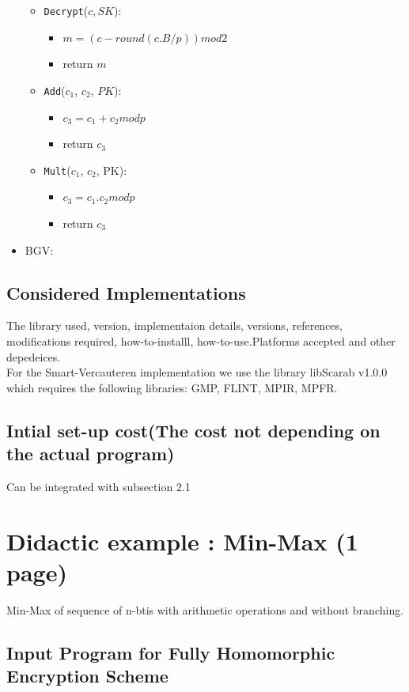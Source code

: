 \documentclass{acm_proc_article-sp}
\begin{document}
\begin{itemize}
\begin{itemize}
\begin{itemize}
\end{itemize}
\item \texttt{Decrypt}($c, SK$):
\begin{itemize}
\item $m= (c - round(c.B/p)) mod 2$
\item return $m$
\end{itemize}
\item \texttt{Add}($c_1$, $c_2$, $PK$):
\begin{itemize}
\item $c_3=c_1+c_2 mod p$
\item return $c_3$
\end{itemize}
\item \texttt{Mult}($c_1$, $c_2$, PK):
\begin{itemize}
\item $c_3=c_1.c_2 mod p$
\item return $c_3$
\end{itemize}
\end{itemize}
\item BGV:
\end{itemize}
\subsection{Considered Implementations}

The library used, version, implementaion details, versions, references, modifications required, how-to-installl, how-to-use.Platforms accepted and other depedeices.\\
For the Smart-Vercauteren implementation we use the library libScarab v1.0.0 which requires the following libraries: GMP, FLINT, MPIR, MPFR.
\subsection{Intial set-up cost(The cost not depending on the actual program)}

Can be integrated with subsection 2.1 

\section{ Didactic example :  Min-Max (1 page)}
Min-Max of sequence of n-btis with arithmetic operations and without branching.
\subsection{Input Program for Fully Homomorphic Encryption Scheme}
\end{document}
